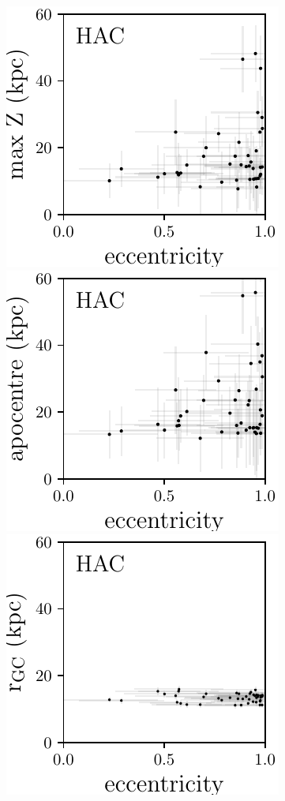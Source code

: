 \documentclass[fleqn,usenatbib]{mnras}
\begin{document}
%
\begin{figure}
	\includegraphics[scale=0.473]{HAC_orbits_ecc_z.pdf}
    \includegraphics[scale=0.473]{HAC_orbits_apo_ecc.pdf} 
  \includegraphics[scale=0.473]{HAC_orbits_ecc_r.pdf} 

\end{figure}
\end{document}
